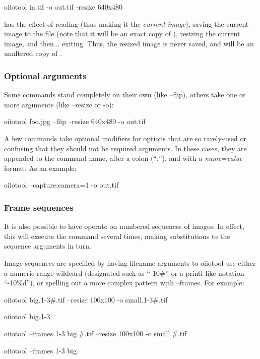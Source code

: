 \begin{code}
    oiiotool in.tif -o out.tif -resize 640x480
\end{code}

\noindent has the effect of reading  (thus making it the
\emph{current image}), saving the current image to the file 
(note that it will be an exact copy of ), resizing the current
image, and then... exiting. Thus, the resized image is never saved, and
 will be an unaltered copy of .

\subsubsection*{Optional arguments}
\label{sec:oiiotooloptionalargs}

Some commands stand completely on their own (like {\cf --flip}), others
take one or more arguments (like {\cf --resize} or {\cf -o}):

\smallskip
\hspace{0.25in} {\cf oiiotool foo.jpg --flip --resize 640x480 -o out.tif}
\smallskip

A few commands take optional modifiers for options that are so
rarely-used or confusing that they should not be required arguments.
In these cases, they are appended to the command name, after a colon
(``{\cf :}''), and with a \emph{name}{\cf =}\emph{value} format.  As
an example:

\smallskip
\hspace{0.25in} {\cf oiiotool --capture:camera=1 -o out.tif}
\smallskip

\subsubsection*{Frame sequences}

It is also possible to have \oiiotool operate on numbered sequences of
images.  In effect, this will execute the \oiiotool command several
times, making substitutions to the sequence arguments in turn.

Image sequences are specified by having filename arguments to
oiiotool use either a numeric range wildcard (designated such as
``{-10\#}'' or a {\cf printf}-like notation ``{-10\%d}''),
or spelling out a more complex pattern with
{\cf --frames}.  For example:

\begin{code}
    oiiotool big.1-3#.tif --resize 100x100 -o small.1-3#.tif

    oiiotool big.1-3%

    oiiotool --frames 1-3 big.#.tif --resize 100x100 -o small.#.tif

    oiiotool --frames 1-3 big.%
\end{code}


